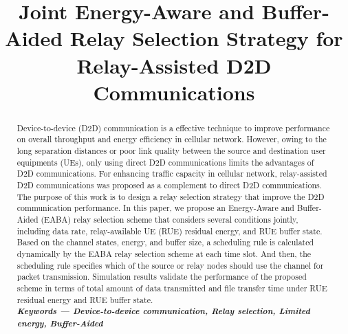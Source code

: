 \documentclass[conference]{IEEEtran}
\begin{document}
\title{Joint Energy-Aware and Buffer-Aided Relay Selection Strategy for Relay-Assisted D2D Communications}

\author{
}


\maketitle
\begin{abstract}
Device-to-device (D2D) communication is a effective technique to improve performance on overall throughput and energy efficiency in cellular network. However, owing to the long separation distances or poor link quality between the source and destination user equipments (UEs), only using direct D2D communications limits the advantages of D2D communications. For enhancing traffic capacity in cellular network, relay-assisted D2D communications was proposed as a complement to direct D2D communications. The purpose of this work is to design a relay selection strategy that improve the D2D communication performance. In this paper, we propose an Energy-Aware and Buffer-Aided (EABA) relay selection scheme that considers several conditions jointly, including data rate, relay-available UE (RUE) residual energy, and RUE buffer state. Based on the channel states, energy, and buffer size, a scheduling rule is calculated dynamically by the EABA relay selection scheme at each time slot. And then, the scheduling rule specifies which of the source or relay nodes should use the channel for packet transmission. Simulation results validate the performance of the proposed scheme in terms of total amount of data transmitted and file transfer time under RUE residual energy and RUE buffer state.
\\
\textbf {\small \emph{Keywords --- Device-to-device communication, Relay selection, Limited energy, Buffer-Aided}}
\end{abstract}
\end{document}
